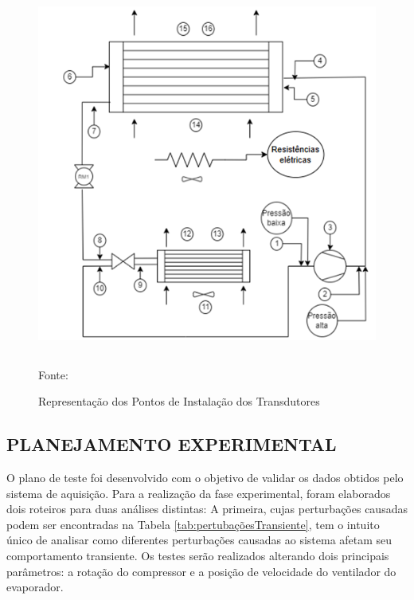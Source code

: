 \begin{figure}[ht]
    \centering
     \caption{Representação dos Pontos de Instalação dos Transdutores}
    \includegraphics[width=11.75cm, height=11.88cm]{FigurasdoTexto/Instalação Transdutores.png}
    \vspace{5pt}  %
    
    {\footnotesize Fonte: \textcite{Oliveira2025}}  %
    \label{fig:instalação transdutores}
\end{figure}

\newpage
\subsection{PLANEJAMENTO EXPERIMENTAL} \label{subsec:PlanejamentoExperimental}

O plano de teste foi desenvolvido com o objetivo de validar os dados obtidos pelo sistema de aquisição. Para a realização da fase experimental, foram elaborados dois roteiros para duas análises distintas: A primeira, cujas perturbações causadas podem ser encontradas na Tabela \ref{tab:pertubaçõesTransiente}, tem o intuito único de analisar como diferentes perturbações causadas ao sistema afetam seu comportamento transiente. Os testes serão realizados alterando dois principais parâmetros: a  rotação do compressor e a posição de velocidade do ventilador do evaporador.


